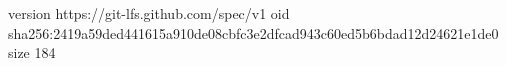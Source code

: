 version https://git-lfs.github.com/spec/v1
oid sha256:2419a59ded441615a910de08cbfc3e2dfcad943c60ed5b6bdad12d24621e1de0
size 184
